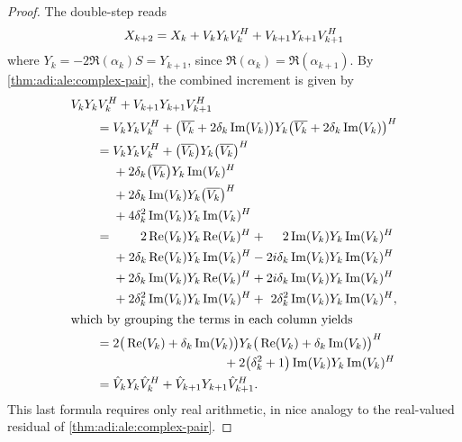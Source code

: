 \begin{proof}
  The double-step reads
  \begin{equation*}
    X_{k+2} = X_k
    + V_k Y_k V_k^H
    + V_{k+1} Y_{k+1} V_{k+1}^H
  \end{equation*}
  where $Y_k = -2 \Re(\alpha_k) S = Y_{k+1}$,
  since $\Re(\alpha_k) = \Re(\alpha_{k+1})$.
  By \autoref{thm:adi:ale:complex-pair},
  the combined increment is given by
  \begin{align*}
    \MoveEqLeft
    V_k Y_k V_k^\HT + V_{k+1} Y_{k+1} V_{k+1}^\HT
    \\
    &= V_k Y_k V_k^\HT +
    \big( \conj{V_k} + 2\delta_k \Im(V_k) \big)
    Y_k
    \big( \conj{V_k} + 2\delta_k \Im(V_k) \big)^\HT
    \\
    &= \begin{aligned}[t]
      & V_k Y_k V_k^\HT + \big( \conj{V_k} \big) Y_k \big( \conj{V_k} \big)^\HT \\
      & + 2\delta_k \big( \conj{V_k} \big) Y_k \Im(V_k)^\HT \\
      & + 2\delta_k \Im(V_k) Y_k \big( \conj{V_k} \big)^\HT \\
      & + 4\delta_k^2 \Im(V_k) Y_k \Im(V_k)^\HT
    \end{aligned}
    \\
    &= \begin{alignedat}[t]{4}
      &&                 2 \Re(V_k) & Y_k \Re(V_k)^\HT &
      &{}+{}&            2 \Im(V_k) & Y_k \Im(V_k)^\HT
      \\
      &{}+{}&    2\delta_k \Re(V_k) & Y_k \Im(V_k)^\HT &
      &{}-{}& 2\im\delta_k \Im(V_k) & Y_k \Im(V_k)^\HT
      \\
      &{}+{}&    2\delta_k \Im(V_k) & Y_k \Re(V_k)^\HT &
      &{}+{}& 2\im\delta_k \Im(V_k) & Y_k \Im(V_k)^\HT
      \\
      &{}+{}&  2\delta_k^2 \Im(V_k) & Y_k \Im(V_k)^\HT &
      &{}+{}&  2\delta_k^2 \Im(V_k) & Y_k \Im(V_k)^\HT
      ,
    \end{alignedat}
    \\
\intertext{which by grouping the terms in each column yields}
    &= \begin{multlined}[t]
      2 \big( \Re(V_k) + \delta_k \Im(V_k) \big)
      Y_k \big( \Re(V_k) + \delta_k \Im(V_k) \big)^\HT
      \\
      + 2\big( \delta_k^2 + 1 \big) \Im(V_k) Y_k \Im(V_k)^\HT
    \end{multlined}
    \\
    &= \hat V_k Y_k \hat V_k^\HT
    + \hat V_{k+1} Y_{k+1} \hat V_{k+1}^\HT
    .
  \end{align*}
  This last formula requires only real arithmetic,
  in nice analogy to the real-valued residual of \autoref{thm:adi:ale:complex-pair}.
\end{proof}

